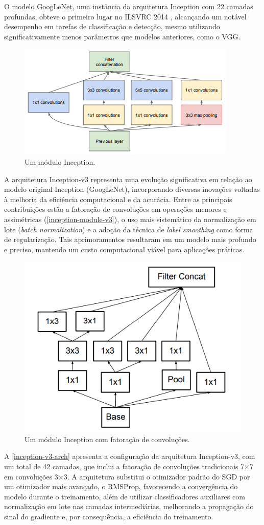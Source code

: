 O modelo GoogLeNet, uma instância da arquitetura Inception com 22 camadas profundas, obteve o primeiro lugar no ILSVRC 2014 \citep{Russakovsky2015}, alcançando um notável desempenho em tarefas de classificação e detecção, mesmo utilizando significativamente menos parâmetros que modelos anteriores, como o VGG.

\begin{figure}[h]
    \centering
    \includegraphics[width=0.5\linewidth]{figs/inception-module.png}
    \caption{Um módulo Inception.}
    \label{inception-module}
\end{figure}

A arquitetura Inception-v3 \citep{Szegedy2016} representa uma evolução significativa em relação ao modelo original Inception (GoogLeNet), incorporando diversas inovações voltadas à melhoria da eficiência computacional e da acurácia. Entre as principais contribuições estão a fatoração de convoluções em operações menores e assimétricas (\autoref{inception-module-v3}), o uso mais sistemático da normalização em lote (\textit{batch normalization}) e a adoção da técnica de \textit{label smoothing} como forma de regularização. Tais aprimoramentos resultaram em um modelo mais profundo e preciso, mantendo um custo computacional viável para aplicações práticas.

\begin{figure}[h]
    \centering
    \includegraphics[width=0.5\linewidth]{figs/inception-module-v3.png}
    \caption{Um módulo Inception com fatoração de convoluções.}
    \label{inception-module-v3}
\end{figure}

A \autoref{inception-v3-arch} apresenta a configuração da arquitetura Inception-v3, com um total de 42 camadas, que inclui a fatoração de convoluções tradicionais 7×7 em convoluções 3×3. A arquitetura substitui o otimizador padrão do SGD por um otimizador mais avançado, o RMSProp, favorecendo a convergência do modelo durante o treinamento, além de utilizar classificadores auxiliares com normalização em lote nas camadas intermediárias, melhorando a propagação do sinal do gradiente e, por consequência, a eficiência do treinamento.

